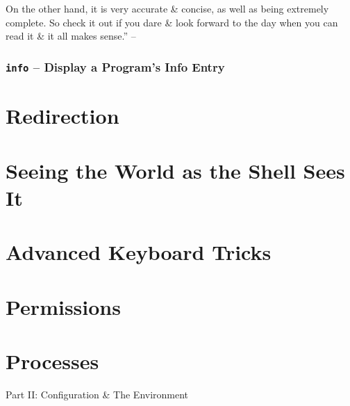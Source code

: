\documentclass[oneside]{book}
\numberwithin{equation}{section}
\begin{document}
On the other hand, it is very accurate \& concise, as well as being extremely complete. So check it out if you dare \& look forward to the day when you can read it \& it all makes sense.'' -- \cite[p. 90]{Shotts2019}

\subsubsection{\texttt{info} -- Display a Program's Info Entry}


\section{Redirection}


\section{Seeing the World as the Shell Sees It}


\section{Advanced Keyboard Tricks}


\section{Permissions}


\section{Processes}


\begin{center}
	\huge Part II: Configuration \& The Environment
\end{center}
\end{document}

